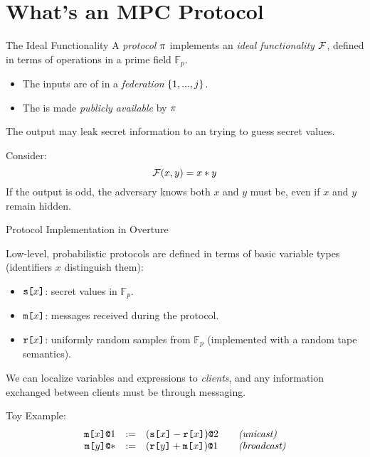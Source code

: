 \documentclass{beamer}
\begin{document}
\section{What's an MPC Protocol}

\begin{frame}{The Ideal Functionality}
  A \emph{protocol} $\pi$ implements an \emph{ideal functionality} $\mathcal{F}$,
  defined in terms of operations in a prime field $\mathbb{F}_p$.
  \begin{itemize}
  \item The inputs are  of  in a \emph{federation}
    $\{ 1,...,j \}$.
  \item The  is made \emph{publicly available} by $\pi$
  \end{itemize}
  The output may leak secret information to an  trying to
  guess secret values.

  \begin{exampleblock}{Consider:}
  $$
  \mathcal{F}(x,y) = x * y
  $$
  If the output is odd, the adversary knows both $x$ and $y$ must be, even
  if $x$ and $y$ remain hidden.
  \end{exampleblock}
  
\end{frame}
 
\begin{frame}{Protocol Implementation in Overture}

  Low-level, probabilistic protocols are defined in terms of basic variable types
  (identifiers $x$ distinguish them):
  \begin{itemize}
  \item $\texttt{s[}x\texttt{]}$: secret values in $\mathbb{F}_p$.
  \item $\texttt{m[}x\texttt{]}$: messages received during the protocol.
  \item $\texttt{r[}x\texttt{]}$: uniformly random samples from $\mathbb{F}_p$ (implemented with
    a random tape semantics).
  \end{itemize}
  We can localize variables and expressions to \emph{clients}, and any information
  exchanged between clients must be through messaging.
  \begin{exampleblock}{Toy Example:}
    $$
    \begin{array}{rcl@{\qquad}l}
      \mx{x}{1} &:=& \elab{(\secret{x} - \flip{x})}{2}  & \textit{(unicast)}\\
      \mx{y}{*} &:=& \elab{(\flip{y} + \mesg{x})}{1}  & \textit{(broadcast)}
    \end{array}
    $$ 
  \end{exampleblock}
\end{frame}
\end{document}
